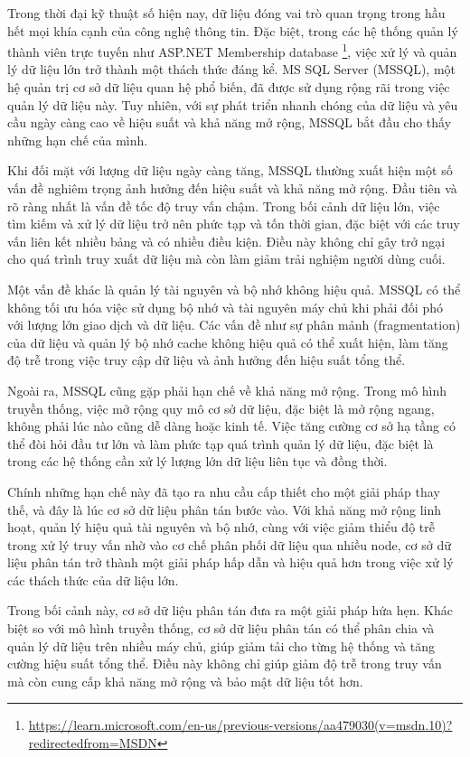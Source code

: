 \documentclass[50pt]{extarticle}
\begin{document}
Trong thời đại kỹ thuật số hiện nay, dữ liệu đóng vai trò quan trọng trong hầu hết mọi khía cạnh của công nghệ thông tin. Đặc biệt, trong các hệ thống quản lý thành viên trực tuyến như ASP.NET Membership database \footnote{\url{https://learn.microsoft.com/en-us/previous-versions/aa479030(v=msdn.10)?redirectedfrom=MSDN}}, việc xử lý và quản lý dữ liệu lớn trở thành một thách thức đáng kể. MS SQL Server (MSSQL), một hệ quản trị cơ sở dữ liệu quan hệ phổ biến, đã được sử dụng rộng rãi trong việc quản lý dữ liệu này. Tuy nhiên, với sự phát triển nhanh chóng của dữ liệu và yêu cầu ngày càng cao về hiệu suất và khả năng mở rộng, MSSQL bắt đầu cho thấy những hạn chế của mình.

Khi đối mặt với lượng dữ liệu ngày càng tăng, MSSQL thường xuất hiện một số vấn đề nghiêm trọng ảnh hưởng đến hiệu suất và khả năng mở rộng. Đầu tiên và rõ ràng nhất là vấn đề tốc độ truy vấn chậm. Trong bối cảnh dữ liệu lớn, việc tìm kiếm và xử lý dữ liệu trở nên phức tạp và tốn thời gian, đặc biệt với các truy vấn liên kết nhiều bảng và có nhiều điều kiện. Điều này không chỉ gây trở ngại cho quá trình truy xuất dữ liệu mà còn làm giảm trải nghiệm người dùng cuối.

Một vấn đề khác là quản lý tài nguyên và bộ nhớ không hiệu quả. MSSQL có thể không tối ưu hóa việc sử dụng bộ nhớ và tài nguyên máy chủ khi phải đối phó với lượng lớn giao dịch và dữ liệu. Các vấn đề như sự phân mảnh (fragmentation) của dữ liệu và quản lý bộ nhớ cache không hiệu quả có thể xuất hiện, làm tăng độ trễ trong việc truy cập dữ liệu và ảnh hưởng đến hiệu suất tổng thể.

Ngoài ra, MSSQL cũng gặp phải hạn chế về khả năng mở rộng. Trong mô hình truyền thống, việc mở rộng quy mô cơ sở dữ liệu, đặc biệt là mở rộng ngang, không phải lúc nào cũng dễ dàng hoặc kinh tế. Việc tăng cường cơ sở hạ tầng có thể đòi hỏi đầu tư lớn và làm phức tạp quá trình quản lý dữ liệu, đặc biệt là trong các hệ thống cần xử lý lượng lớn dữ liệu liên tục và đồng thời.

Chính những hạn chế này đã tạo ra nhu cầu cấp thiết cho một giải pháp thay thế, và đây là lúc cơ sở dữ liệu phân tán bước vào. Với khả năng mở rộng linh hoạt, quản lý hiệu quả tài nguyên và bộ nhớ, cùng với việc giảm thiểu độ trễ trong xử lý truy vấn nhờ vào cơ chế phân phối dữ liệu qua nhiều node, cơ sở dữ liệu phân tán trở thành một giải pháp hấp dẫn và hiệu quả hơn trong việc xử lý các thách thức của dữ liệu lớn.

Trong bối cảnh này, cơ sở dữ liệu phân tán đưa ra một giải pháp hứa hẹn. Khác biệt so với mô hình truyền thống, cơ sở dữ liệu phân tán có thể phân chia và quản lý dữ liệu trên nhiều máy chủ, giúp giảm tải cho từng hệ thống và tăng cường hiệu suất tổng thể. Điều này không chỉ giúp giảm độ trễ trong truy vấn mà còn cung cấp khả năng mở rộng và bảo mật dữ liệu tốt hơn.
\end{document}
